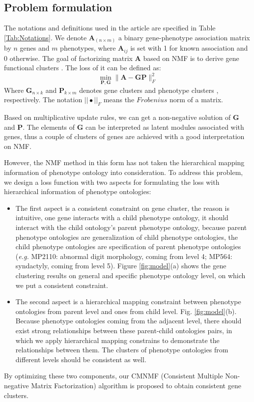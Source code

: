 \documentclass{bmcart}
\begin{document}
\subsection*{\textbf{Problem formulation}}
The notations and definitions used in the article are specified in Table \ref{Tab:Notations}.
We denote $\bm{A}_{(n \times m)}$ a binary gene-phenotype association matrix by $n$ genes and $m$ phenotypes, where $\bm{A}_{ij}$ is set with 1 for known association and 0 otherwise. The goal of factorizing matrix $\bm{A}$ based on NMF\cite{DanielD.Lee2001} is to derive gene functional clusters . The loss of it can be defined as:
\begin{equation}\label{equ:NMF}
\mathop{min}_{{\bm{P},\bm{G}}} \|\bm{A}-\bm{GP}\|^{2}_{F}
\end{equation}
Where $\bm{G}_{n\times k}$ and $\bm{P}_{k\times m}$ denotes gene clusters and phenotype clusters , respectively. The notation $||\bullet||_F$ means the $Frobenius$ norm of a matrix.

Based on multiplicative update rules\cite{DanielD.Lee2001}, we can get a non-negative solution of $\bm{G}$ and $\bm{P}$. The elements of $\bm{G}$ can be interpreted as latent modules associated with genes, thus a couple of clusters of genes are achieved with a good interpretation on NMF.

However, the NMF method in this form has not taken the hierarchical mapping information of phenotype ontology into consideration. To address this problem, we design a loss function with two aspects for formulating the loss with hierarchical information of phenotype ontologies:
\begin{itemize}
\item The first aspect is a consistent constraint on gene cluster, the reason is intuitive, one gene interacts with a child phenotype ontology, it should interact with the child ontology's parent phenotype ontology, because parent phenotype ontologies are generalization of child phenotype ontologies, the child phenotype ontologies are specification of parent phenotype ontologies (\emph{e.g.} MP2110: abnormal digit morphology, coming from level 4; MP564: syndactyly, coming from level 5). Figure \ref{fig:model}(a) shows the gene clustering results on general and specific phenotype ontology level, on which we put a consistent constraint.
\item The second aspect is a hierarchical mapping constraint between phenotype ontologies from parent level and ones from child level. Fig. \ref{fig:model}(b). Because phenotype ontologies coming from the adjacent level, there should exist strong relationships between these parent-child ontologies pairs, in which we apply hierarchical mapping constrains to demonstrate the relationships between them. The clusters of phenotype ontologies from different levels should be consistent as well.
\end{itemize}
By optimizing these two components, our CMNMF (Consistent Multiple Non-negative Matrix Factorization) algorithm is proposed to obtain consistent gene clusters.
\end{document}
